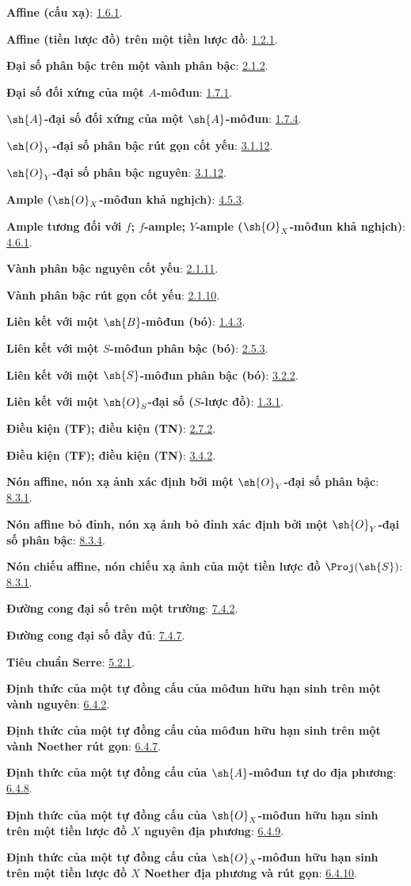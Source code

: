 \documentclass[oneside,10pt]{amsart}
\begin{document}
\begingroup
\small
\setlength{\parindent}{0pt}
\setlength{\parskip}{2pt}
\newcommand{\egaTerm}[2]{\textbf{#1}: #2.\par}

\egaTerm{Affine (cấu xạ)}{\hyperref[II.1.6.1]{1.6.1}}
\egaTerm{Affine (tiền lược đồ) trên một tiền lược đồ}{\hyperref[II.1.2.1]{1.2.1}}
\egaTerm{Đại số phân bậc trên một vành phân bậc}{\hyperref[II.2.1.2]{2.1.2}}
\egaTerm{Đại số đối xứng của một $A$-môđun}{\hyperref[II.1.7.1]{1.7.1}}
\egaTerm{$\sh{A}$-đại số đối xứng của một $\sh{A}$-môđun}{\hyperref[II.1.7.4]{1.7.4}}
\egaTerm{$\sh{O}_Y$-đại số phân bậc rút gọn cốt yếu}{\hyperref[II.3.1.12]{3.1.12}}
\egaTerm{$\sh{O}_Y$-đại số phân bậc nguyên}{\hyperref[II.3.1.12]{3.1.12}}
\egaTerm{Ample ($\sh{O}_X$-môđun khả nghịch)}{\hyperref[II.4.5.3]{4.5.3}}
\egaTerm{Ample tương đối với $f$; $f$-ample; $Y$-ample ($\sh{O}_X$-môđun khả nghịch)}{\hyperref[II.4.6.1]{4.6.1}}
\egaTerm{Vành phân bậc nguyên cốt yếu}{\hyperref[II.2.1.11]{2.1.11}}
\egaTerm{Vành phân bậc rút gọn cốt yếu}{\hyperref[II.2.1.10]{2.1.10}}
\egaTerm{Liên kết với một $\sh{B}$-môđun (bó)}{\hyperref[II.1.4.3]{1.4.3}}
\egaTerm{Liên kết với một $S$-môđun phân bậc (bó)}{\hyperref[II.2.5.3]{2.5.3}}
\egaTerm{Liên kết với một $\sh{S}$-môđun phân bậc (bó)}{\hyperref[II.3.2.2]{3.2.2}}
\egaTerm{Liên kết với một $\sh{O}_S$-đại số ($S$-lược đồ)}{\hyperref[II.1.3.1]{1.3.1}}

\egaTerm{Điều kiện (TF); điều kiện (TN)}{\hyperref[II.2.7.2]{2.7.2}}
\egaTerm{Điều kiện (TF); điều kiện (TN)}{\hyperref[II.3.4.2]{3.4.2}}
\egaTerm{Nón affine, nón xạ ảnh xác định bởi một $\sh{O}_Y$-đại số phân bậc}{\hyperref[II.8.3.1]{8.3.1}}
\egaTerm{Nón affine bỏ đỉnh, nón xạ ảnh bỏ đỉnh xác định bởi một $\sh{O}_Y$-đại số phân bậc}{\hyperref[II.8.3.4]{8.3.4}}
\egaTerm{Nón chiếu affine, nón chiếu xạ ảnh của một tiền lược đồ $\Proj(\sh{S})$}{\hyperref[II.8.3.1]{8.3.1}}
\egaTerm{Đường cong đại số trên một trường}{\hyperref[II.7.4.2]{7.4.2}}
\egaTerm{Đường cong đại số đầy đủ}{\hyperref[II.7.4.7]{7.4.7}}
\egaTerm{Tiêu chuẩn Serre}{\hyperref[II.5.2.1]{5.2.1}}

\egaTerm{Định thức của một tự đồng cấu của môđun hữu hạn sinh trên một vành nguyên}{\hyperref[II.6.4.2]{6.4.2}}
\egaTerm{Định thức của một tự đồng cấu của môđun hữu hạn sinh trên một vành Noether rút gọn}{\hyperref[II.6.4.7]{6.4.7}}
\egaTerm{Định thức của một tự đồng cấu của $\sh{A}$-môđun tự do địa phương}{\hyperref[II.6.4.8]{6.4.8}}
\egaTerm{Định thức của một tự đồng cấu của $\sh{O}_X$-môđun hữu hạn sinh trên một tiền lược đồ $X$ nguyên địa phương}{\hyperref[II.6.4.9]{6.4.9}}
\egaTerm{Định thức của một tự đồng cấu của $\sh{O}_X$-môđun hữu hạn sinh trên một tiền lược đồ $X$ Noether địa phương và rút gọn}{\hyperref[II.6.4.10]{6.4.10}}
\end{document}
